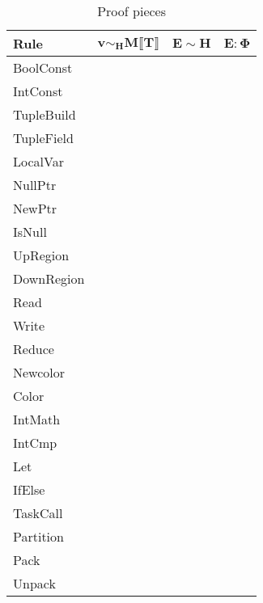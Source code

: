 \begin{table*}
\centering
{\small
\begin{tabular}{l|p{5cm}|p{5cm}|p{5cm}}
{\bf Rule} & 
\multicolumn{1}{|c|}{$\mathbf{v \sim_H M \llbracket T \rrbracket}$} &
\multicolumn{1}{|c|}{$\mathbf{E \sim H}$} &
\multicolumn{1}{|c|}{$\mathbf{E : \Phi}$} \\
\hline
BoolConst & & & \\
IntConst & & & \\
TupleBuild & & & \\
TupleField & & & \\
LocalVar & & & \\
NullPtr & & & \\
NewPtr & & & \\
IsNull & & & \\
UpRegion & & & \\
DownRegion & & & \\
Read & & & \\
Write & & & \\
Reduce & & & \\
Newcolor & & & \\
Color & & & \\
IntMath & & & \\
IntCmp & & & \\
Let & & & \\
IfElse & & & \\
TaskCall & & & \\
Partition & & & \\
Pack & & & \\
Unpack & & &
\end{tabular}}
\caption{Proof pieces}
\end{table*}
